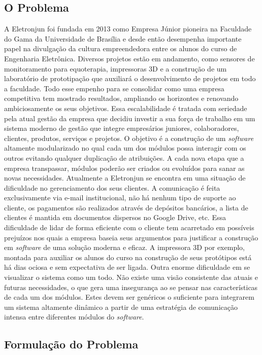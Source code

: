     \subsection{O Problema}
    A Eletronjun foi fundada em 2013 como Empresa Júnior pioneira na Faculdade do Gama da Universidade de Brasília e desde então desempenha importante papel na divulgação da cultura empreendedora entre os alunos do curso de Engenharia Eletrônica. Diversos projetos estão em andamento, como sensores de monitoramento para equoterapia, impressoras 3D e a construção de um laboratório de prototipação que auxiliará o desenvolvimento de projetos em todo a faculdade.
    Todo esse empenho para se consolidar como uma empresa competitiva tem mostrado resultados, ampliando os horizontes e renovando ambiciosamente os seus objetivos.
    Essa escalabilidade é tratada com seriedade pela atual gestão da empresa que decidiu investir a sua força de trabalho em um sistema moderno de gestão que integre empresários juniores, colaboradores, clientes, produtos, serviços e projetos. O objetivo é a construção de um \textit{software} altamente modularizado no qual cada um dos módulos possa interagir com os outros evitando qualquer duplicação de atribuições. A cada nova etapa que a empresa transpassar, módulos poderão ser criados ou evoluídos para sanar as novas necessidades.
    Atualmente a Eletronjun se encontra em uma situação de dificuldade no gerenciamento dos seus clientes. A comunicação é feita exclusivamente via e-mail institucional, não há nenhum tipo de suporte ao cliente, os pagamentos são realizados através de depósitos bancários, a lista de clientes é mantida em documentos dispersos no Google Drive, etc. Essa dificuldade de lidar de forma eficiente com o cliente tem acarretado em possíveis prejuízos nos quais a empresa baseia seus argumentos para justificar a construção em \textit{software} de uma solução moderna e eficaz. A impressora 3D por exemplo, montada para auxiliar os alunos do curso na construção de seus protótipos está há dias ociosa e sem expectativa de ser ligada.
    Outra enorme dificuldade em se visualizar o sistema como um todo. Não existe uma visão consistente das atuais e futuras necessidades, o que gera uma insegurança ao se pensar nas características de cada um dos módulos. Estes devem ser genéricos o suficiente para integrarem um sistema altamente dinâmico a partir de uma estratégia de comunicação intensa entre diferentes módulos do \textit{software}.
    \subsection{Formulação do Problema}

